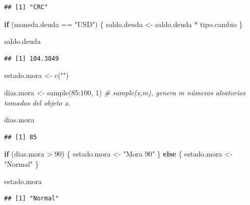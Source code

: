 \documentclass[
  12pt,
]{book}
\newenvironment{Shaded}{\begin{snugshade}}{\end{snugshade}}
\newcommand{\CommentTok}[1]{\textcolor[rgb]{0.56,0.35,0.01}{\textit{#1}}}
\newcommand{\ControlFlowTok}[1]{\textcolor[rgb]{0.13,0.29,0.53}{\textbf{#1}}}
\newcommand{\DecValTok}[1]{\textcolor[rgb]{0.00,0.00,0.81}{#1}}
\newcommand{\FunctionTok}[1]{\textcolor[rgb]{0.00,0.00,0.00}{#1}}
\newcommand{\NormalTok}[1]{#1}
\newcommand{\OtherTok}[1]{\textcolor[rgb]{0.56,0.35,0.01}{#1}}
\newcommand{\SpecialCharTok}[1]{\textcolor[rgb]{0.00,0.00,0.00}{#1}}
\newcommand{\StringTok}[1]{\textcolor[rgb]{0.31,0.60,0.02}{#1}}
\begin{document}
\begin{verbatim}
## [1] "CRC"
\end{verbatim}

\begin{Shaded}
\begin{Highlighting}[]
\ControlFlowTok{if}\NormalTok{ (moneda.deuda }\SpecialCharTok{==} \StringTok{"USD"}\NormalTok{) \{}
\NormalTok{  saldo.deuda }\OtherTok{\textless{}{-}}\NormalTok{ saldo.deuda }\SpecialCharTok{*}\NormalTok{ tipo.cambio}
\NormalTok{\}}


\NormalTok{saldo.deuda}
\end{Highlighting}
\end{Shaded}

\begin{verbatim}
## [1] 104.3849
\end{verbatim}

\begin{Shaded}
\begin{Highlighting}[]
\NormalTok{estado.mora }\OtherTok{\textless{}{-}} \FunctionTok{c}\NormalTok{(}\StringTok{""}\NormalTok{)}

\NormalTok{dias.mora }\OtherTok{\textless{}{-}} \FunctionTok{sample}\NormalTok{(}\DecValTok{85}\SpecialCharTok{:}\DecValTok{100}\NormalTok{, }\DecValTok{1}\NormalTok{) }\CommentTok{\# sample(x,m), genera m números aleatorios tomados del objeto x.}

\NormalTok{dias.mora}
\end{Highlighting}
\end{Shaded}

\begin{verbatim}
## [1] 85
\end{verbatim}

\begin{Shaded}
\begin{Highlighting}[]
\ControlFlowTok{if}\NormalTok{ (dias.mora }\SpecialCharTok{\textgreater{}} \DecValTok{90}\NormalTok{) \{}
\NormalTok{  estado.mora }\OtherTok{\textless{}{-}} \StringTok{"Mora 90"}
\NormalTok{\} }\ControlFlowTok{else}\NormalTok{ \{}
\NormalTok{  estado.mora }\OtherTok{\textless{}{-}} \StringTok{"Normal"}
\NormalTok{\}}

\NormalTok{estado.mora}
\end{Highlighting}
\end{Shaded}

\begin{verbatim}
## [1] "Normal"
\end{verbatim}
\end{document}

